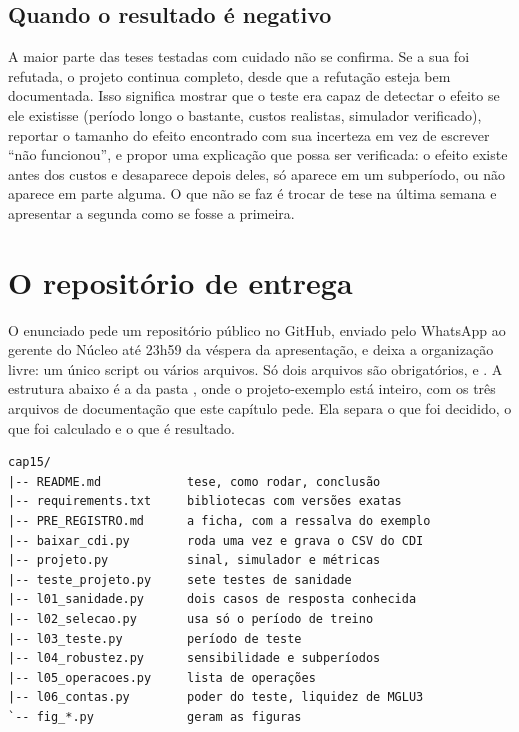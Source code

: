 \subsection{Quando o resultado é negativo}

A maior parte das teses testadas com cuidado não se confirma. Se a sua foi refutada, o projeto continua completo, desde que a refutação esteja bem documentada. Isso significa mostrar que o teste era capaz de detectar o efeito se ele existisse (período longo o bastante, custos realistas, simulador verificado), reportar o tamanho do efeito encontrado com sua incerteza em vez de escrever ``não funcionou'', e propor uma explicação que possa ser verificada: o efeito existe antes dos custos e desaparece depois deles, só aparece em um subperíodo, ou não aparece em parte alguma. O que não se faz é trocar de tese na última semana e apresentar a segunda como se fosse a primeira.

\section{O repositório de entrega}
\label{sec:c15-repo}

O enunciado pede um repositório público no GitHub, enviado pelo WhatsApp ao gerente do Núcleo até 23h59 da véspera da apresentação, e deixa a organização livre: um único script ou vários arquivos. Só dois arquivos são obrigatórios,  e . A estrutura abaixo é a da pasta , onde o projeto-exemplo está inteiro, com os três arquivos de documentação que este capítulo pede. Ela separa o que foi decidido, o que foi calculado e o que é resultado.

\begin{lstlisting}[style=terminal]
cap15/
|-- README.md            tese, como rodar, conclusão
|-- requirements.txt     bibliotecas com versões exatas
|-- PRE_REGISTRO.md      a ficha, com a ressalva do exemplo
|-- baixar_cdi.py        roda uma vez e grava o CSV do CDI
|-- projeto.py           sinal, simulador e métricas
|-- teste_projeto.py     sete testes de sanidade
|-- l01_sanidade.py      dois casos de resposta conhecida
|-- l02_selecao.py       usa só o período de treino
|-- l03_teste.py         período de teste
|-- l04_robustez.py      sensibilidade e subperíodos
|-- l05_operacoes.py     lista de operações
|-- l06_contas.py        poder do teste, liquidez de MGLU3
`-- fig_*.py             geram as figuras
\end{lstlisting}


